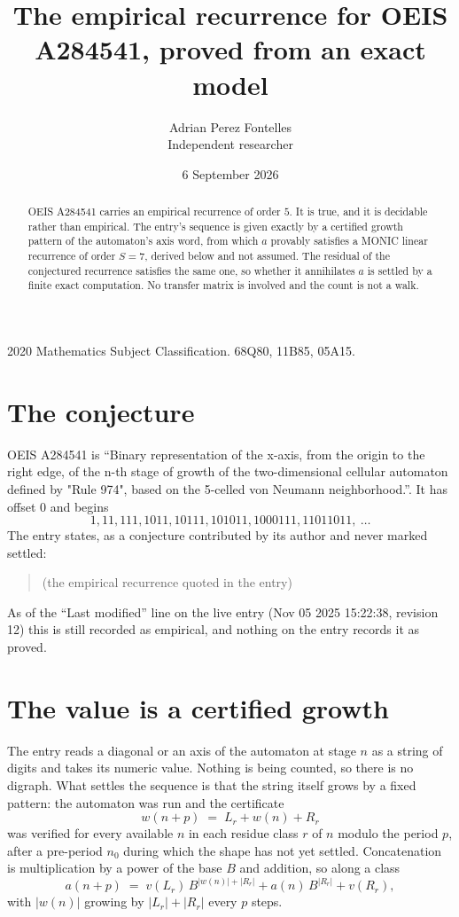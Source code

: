 \documentclass[11pt,a4paper]{article}
\title{The empirical recurrence for OEIS A284541, proved from an exact model}
\author{Adrian Perez Fontelles\\ \small Independent researcher}
\date{6 September 2026}
\theoremstyle{plain}
\theoremstyle{definition}
\begin{document}
\maketitle

\begin{abstract}
OEIS A284541 carries an empirical recurrence of order $5$. It is true, and it is
decidable rather than empirical. The entry's sequence is given exactly by a certified growth pattern of the automaton's axis word, from
which $a$ provably satisfies a MONIC linear recurrence of order $S=7$, derived below and not
assumed. The residual of the conjectured recurrence satisfies the same one, so whether it
annihilates $a$ is settled by a finite exact computation. No transfer matrix is involved and
the count is not a walk.
\end{abstract}

\noindent\small 2020 Mathematics Subject Classification. 68Q80, 11B85, 05A15.\normalsize

\section{The conjecture}

OEIS A284541 is ``Binary representation of the x-axis, from the origin to the right edge, of the n-th stage of growth of the two-dimensional cellular automaton defined by "Rule 974", based on the 5-celled von Neumann neighborhood.''. It has offset $0$ and begins
\[
1, 11, 111, 1011, 10111, 101011, 1000111, 11011011,\ \dots
\]
The entry states, as a conjecture contributed by its author and never marked settled:
\begin{quote}
(the empirical recurrence quoted in the entry)
\end{quote}
As of the ``Last modified'' line on the live entry (Nov 05 2025 15:22:38, revision 12)
this is still recorded as empirical, and nothing on the entry records it as proved.

\section{The value is a certified growth}

The entry reads a diagonal or an axis of the automaton at stage $n$ as a string of digits and takes its
numeric value. Nothing is being counted, so there is no digraph. What settles the sequence is
that the string itself grows by a fixed pattern: the automaton was run and the certificate
\[
w(n+p)\;=\;L_r + w(n) + R_r
\]
was verified for every available $n$ in each residue class $r$ of $n$ modulo the period $p$,
after a pre-period $n_0$ during which the shape has not yet settled. Concatenation is
multiplication by a power of the base $B$ and addition, so along a class
\[
a(n+p)\;=\;v(L_r)\,B^{|w(n)|+|R_r|} + a(n)\,B^{|R_r|} + v(R_r),
\]
with $|w(n)|$ growing by $|L_r|+|R_r|$ every $p$ steps.
\end{document}
